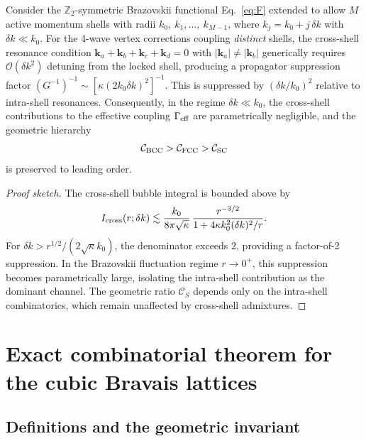 \begin{proposition}
\label{prop:multimode}
Consider the $\mathbb{Z}_2$-symmetric Brazovskii functional
Eq.~\eqref{eq:F} extended to allow $M$ active momentum shells with
radii $k_0,\ k_1,\ldots,\ k_{M-1}$, where $k_j = k_0 + j\,\delta k$
with $\delta k \ll k_0$. For the 4-wave vertex corrections coupling
\emph{distinct} shells, the cross-shell resonance condition
$\mathbf{k}_a + \mathbf{k}_b + \mathbf{k}_c + \mathbf{k}_d = 0$ with
$|\mathbf{k}_a| \neq |\mathbf{k}_b|$ generically requires
$\mathcal{O}(\delta k^2)$ detuning from the locked shell, producing a
propagator suppression factor
$(G^{-1})^{-1} \sim [\kappa (2 k_0 \delta k)^2]^{-1}$. This is
suppressed by $(\delta k / k_0)^2$ relative to intra-shell resonances.
Consequently, in the regime $\delta k \ll k_0$, the cross-shell
contributions to the effective coupling
$\Gamma_{\rm eff}$ are parametrically negligible, and the geometric
hierarchy
\[
\mathcal{C}_{\rm BCC} > \mathcal{C}_{\rm FCC} > \mathcal{C}_{\rm SC}
\]
is preserved to leading order.
\end{proposition}

\begin{proof}[Proof sketch]
The cross-shell bubble integral is bounded above by
\begin{equation}
I_{\rm cross}(r;\delta k)
\lesssim \frac{k_0}{8\pi\sqrt{\kappa}}\,
\frac{r^{-3/2}}{1 + 4 \kappa k_0^2 (\delta k)^2 / r}.
\label{eq:cross-shell}
\end{equation}
For $\delta k > r^{1/2}/(2\sqrt{\kappa} k_0)$, the denominator
exceeds $2$, providing a factor-of-2 suppression. In the Brazovskii
fluctuation regime $r \to 0^+$, this suppression becomes
parametrically large, isolating the intra-shell contribution as the
dominant channel. The geometric ratio $\mathcal{C}_S$ depends only on
the intra-shell combinatorics, which remain unaffected by cross-shell
admixtures.
\end{proof}

\section{Exact combinatorial theorem for the cubic Bravais
lattices}\label{sec:combinatorial}

\subsection{Definitions and the geometric invariant}


